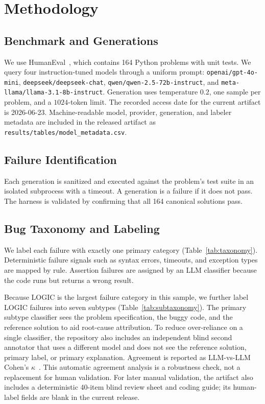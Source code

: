 \documentclass[10pt,journal]{article}
\begin{document}
\section{Methodology}
\subsection{Benchmark and Generations}
We use HumanEval~\cite{chen2021codex}, which contains 164 Python problems with
unit tests. We query four instruction-tuned models through a uniform prompt:
\texttt{openai/gpt-4o-mini}, \texttt{deepseek/deepseek-chat},
\texttt{qwen/qwen-2.5-72b-instruct}, and
\texttt{meta-llama/llama-3.1-8b-instruct}. Generation uses temperature $0.2$, one
sample per problem, and a $1024$-token limit. The recorded access date for the
current artifact is 2026-06-23. Machine-readable model, provider, generation, and
labeler metadata are included in the released artifact as
\texttt{results/tables/model\_metadata.csv}.

\subsection{Failure Identification}
Each generation is sanitized and executed against the problem's test suite in an
isolated subprocess with a timeout. A generation is a failure if it does not pass.
The harness is validated by confirming that all 164 canonical solutions pass.

\subsection{Bug Taxonomy and Labeling}
We label each failure with exactly one primary category (Table~\ref{tab:taxonomy}).
Deterministic failure signals such as syntax errors, timeouts, and exception types
are mapped by rule. Assertion failures are assigned by an LLM classifier because
the code runs but returns a wrong result.

Because LOGIC is the largest failure category in this sample, we further label
LOGIC failures into seven subtypes (Table~\ref{tab:subtaxonomy}). The primary subtype classifier sees the
problem specification, the buggy code, and the reference solution to aid root-cause
attribution. To reduce over-reliance on a single classifier, the repository also
includes an independent blind second annotator that uses a different model and does
not see the reference solution, primary label, or primary explanation. Agreement is
reported as LLM-vs-LLM Cohen's $\kappa$~\cite{cohen1960kappa}. This automatic
agreement analysis is a robustness check, not a replacement for human validation.
For later manual validation, the artifact also includes a deterministic 40-item
blind review sheet and coding guide; its human-label fields are blank in the
current release.
\end{document}
